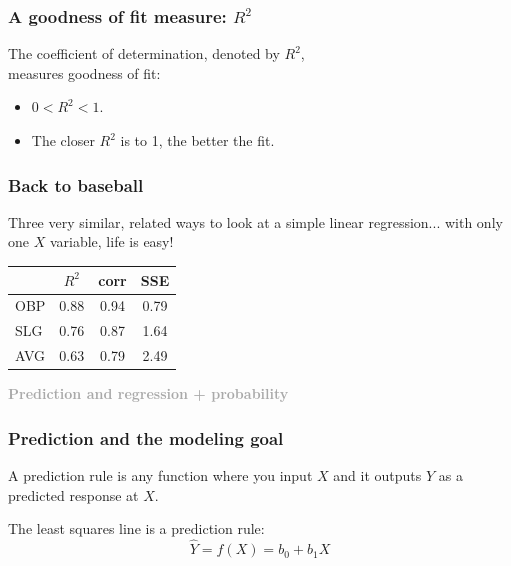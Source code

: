 \documentclass{beamer}
\newcommand{\dg}[1]{\textcolor{darkgray}{#1}}
\newcommand{\bl}{\color{lightblue}}
\newcommand{\rd}{\color{burntorange}}
\newcommand{\bk}{\color{black}}
\newcommand{\mr}[1]{\mathrm{#1}}
\newcommand{\bi}{\begin{itemize}}
\newcommand{\ib}{\end{itemize}}
\newcommand{\p}{\item}
\newcommand{\sk}{\vspace{.5cm}}
\begin{document}
%
%
%

\begin{frame}
\frametitle{A goodness of fit measure: $R^2$} 

The \rd coefficient of determination\bk, denoted by \rd$R^2$\bk, \\
measures goodness of fit: 
\sk{\large \bl
\[
R^2 = \frac{\mr{SSR}}{\mr{SST}} = 1- \frac{\mr{SSE}}{\mr{SST}}
\]}
\bi
\p $0 < R^2 < 1$.
\p The closer $R^2$ is to 1, the better the fit.
\ib

\end{frame}


\begin{frame}
\frametitle{Back to baseball}

Three very similar, related ways to look at a simple linear regression... with only one $X$ variable, life is easy!  

\sk
\sk
\begin{center}
\Large
\begin{tabular}{|l|c|c|c|}
\hline
&$R^2$&corr& SSE \\
\hline
{\color{burntorange}OBP}& {\color{burntorange}0.88}& {\color{burntorange}0.94}& {\color{burntorange}0.79}  \\
SLG& 0.76&0.87 & 1.64 \\
AVG& 0.63 & 0.79&2.49  \\
\hline
\end{tabular}
\end{center}
\end{frame}

\begin{frame}
\sk\sk
	\dg{\bf Prediction and regression + probability }
\end{frame}


\begin{frame}
\frametitle{Prediction and the modeling goal}

\large
A prediction rule is any function where you input $X$ and it outputs
$\hat{Y}$ as a predicted  response at $X$.

\sk \sk
The least squares line is a prediction rule:
\[
\hat{Y} = f(X) = b_0 + b_1 X
\]

\end{frame}
\end{document}
